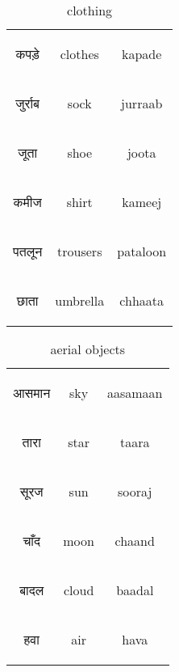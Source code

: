 \begin{table}[H]
    \centering 
    \begin{tabular}{c|c|c}
            \begin{hindi} कपड़े \end{hindi} & clothes & kapade \\
        \begin{hindi} जुर्राब \end{hindi} & sock & jurraab \\
        \begin{hindi} जूता \end{hindi} & shoe & joota \\
        \begin{hindi} कमीज \end{hindi} & shirt & kameej \\
        \begin{hindi} पतलून \end{hindi} & trousers & pataloon \\
                \begin{hindi} छाता \end{hindi} & umbrella & chhaata \\
    \end{tabular}
    \caption{clothing}
    \label{tab:nouns_clothing}
\end{table}

\begin{table}[H]
    \centering 
    \begin{tabular}{c|c|c}
            \begin{hindi} आसमान  \end{hindi} & sky & aasamaan \\
            \begin{hindi} तारा  \end{hindi} & star & taara \\
            \begin{hindi} सूरज  \end{hindi} & sun & sooraj \\
            \begin{hindi} चाँद  \end{hindi} & moon & chaand \\
            \begin{hindi} बादल  \end{hindi} & cloud & baadal \\
            \begin{hindi} हवा  \end{hindi} & air & hava \\
    \end{tabular}
    \caption{aerial objects}
    \label{tab:nouns_aerial}
\end{table}

